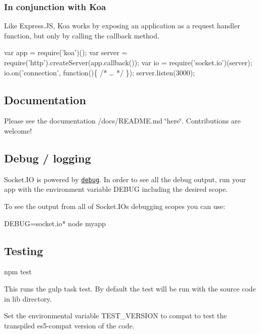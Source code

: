 \subsubsection*{In conjunction with Koa}

Like Express.\+JS, Koa works by exposing an application as a request handler function, but only by calling the {\ttfamily callback} method.


\begin{DoxyCode}
var app = require('koa')();
var server = require('http').createServer(app.callback());
var io = require('socket.io')(server);
io.on('connection', function()\{ /* … */ \});
server.listen(3000);
\end{DoxyCode}


\subsection*{Documentation}

Please see the documentation /docs/\+R\+E\+A\+D\+ME.md \char`\"{}here\char`\"{}. Contributions are welcome!

\subsection*{Debug / logging}

Socket.\+IO is powered by \href{https://github.com/visionmedia/debug}{\tt debug}. In order to see all the debug output, run your app with the environment variable {\ttfamily D\+E\+B\+UG} including the desired scope.

To see the output from all of Socket.\+IO\textquotesingle{}s debugging scopes you can use\+:


\begin{DoxyCode}
DEBUG=socket.io* node myapp
\end{DoxyCode}


\subsection*{Testing}


\begin{DoxyCode}
npm test
\end{DoxyCode}
 This runs the {\ttfamily gulp} task {\ttfamily test}. By default the test will be run with the source code in {\ttfamily lib} directory.

Set the environmental variable {\ttfamily T\+E\+S\+T\+\_\+\+V\+E\+R\+S\+I\+ON} to {\ttfamily compat} to test the transpiled es5-\/compat version of the code.

